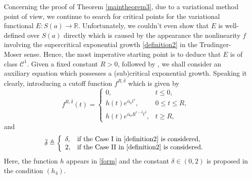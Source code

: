 \documentclass[11pt]{amsart}
\numberwithin{equation}{section}
\theoremstyle{definition}
\newcommand{\R}{\mathbb{R}}
\begin{document}
Concerning the proof of Theorem \ref{maintheorem3},
due to a variational method point of
view, we continue to search for critical points for the variational functional $E:S(a)\to \R$.
Unfortunately, we couldn't even show that $E$ is well-defined over $S(a)$
 directly which is caused by the appearance the nonlinearity $f$ involving the supercritical
exponential growth \eqref{definition2} in the Trudinger-Moser sense.
Hence, the most imperative starting point is to deduce that $E$ is of class $\mathcal{C}^1$. Given a
fixed constant $R > 0$, followed by \cite{AS1,AS2}, we shall consider an auxiliary equation which possesses a
(sub)critical exponential growth. Speaking it clearly, introducing a cutoff function $f^{R,\bar{\delta}}$  which is
given by
\begin{equation} \label{fR}
f^{R, \bar{\delta} }(t)=
\left\{
\begin{array}{ll}
0,&    t\leq0,\\
	 h(t) e^{\bar{\alpha}_0 t^\tau},&    0\leq t \leq R,\\
	h(t) e^{\bar{\alpha}_0 R^{\tau-\bar{\delta}}t^{\bar{\delta}}}, &  t \geq R,
\end{array}
\right.
\end{equation}
and
\[
 \bar{\delta}\triangleq\left\{
   \begin{array}{ll}
    \delta, & \text{if the Case I in \eqref{definition2} is considered},\\
    2, & \text{if the Case II in \eqref{definition2} is considered}.
    \end{array}
 \right.
\]
Here, the function $h$ appears in \eqref{form} and the constant $\delta\in(0,2)$ is proposed in the condition $(h_4)$.
\end{document}
